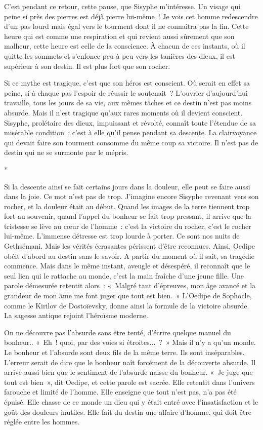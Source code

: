 \documentclass{book}
\begin{document}
C'est pendant ce retour, cette pause, que Sisyphe m'intéresse. Un visage qui peine si près des pierres est déjà pierre lui-même ! Je vois cet homme redescendre d'un pas lourd mais égal vers le tourment dont il ne connaîtra pas la fin. Cette heure qui est comme une respiration et qui revient aussi sûrement que son malheur, cette heure est celle de la conscience. À chacun de ces instants, où il quitte les sommets et s'enfonce peu à peu vers les tanières des dieux, il est supérieur à son destin. Il est plus fort que son rocher.

Si ce mythe est tragique, c'est que son héros est conscient. Où serait en effet sa peine, si à chaque pas l'espoir de réussir le soutenait ? L'ouvrier d'aujourd'hui travaille, tous les jours de sa vie, aux mêmes tâches et ce destin n'est pas moins absurde. Mais il n'est tragique qu'aux rares moments où il devient conscient. Sisyphe, prolétaire des dieux, impuissant et révolté, connaît toute l'étendue de sa misérable condition : c'est à elle qu'il pense pendant sa descente. La clairvoyance qui devait faire son tourment consomme du même coup sa victoire. Il n'est pas de destin qui ne se surmonte par le mépris.

\begin{center}
*
\end{center}

Si la descente ainsi se fait certains jours dans la douleur, elle peut se faire aussi dans la joie. Ce mot n'est pas de trop. J'imagine encore Sisyphe revenant vers son rocher, et la douleur était au début. Quand les images de la terre tiennent trop fort au souvenir, quand l'appel du bonheur se fait trop pressant, il arrive que la tristesse se lève au cœur de l'homme : c'est la victoire du rocher, c'est le rocher lui‑même. L'immense détresse est trop lourde à porter. Ce sont nos nuits de Gethsémani. Mais les vérités écrasantes périssent d'être reconnues. Ainsi, Oedipe obéit d'abord au destin sans le savoir. A partir du moment où il sait, sa tragédie commence. Mais dans le même instant, aveugle et désespéré, il reconnaît que le seul lien qui le rattache au monde, c'est la main fraîche d'une jeune fille. Une parole démesurée retentit alors : « Malgré tant d'épreuves, mon âge avancé et la grandeur de mon âme me font juger que tout est bien. » L'Oedipe de Sophocle, comme le Kirilov de Dostoïevsky, donne ainsi la formule de la victoire absurde. La sagesse antique rejoint l'héroïsme moderne.

On ne découvre pas l'absurde sans être tenté, d'écrire quelque manuel du bonheur.. « Eh ! quoi, par des voies si étroites... ? » Mais il n'y a qu'un monde. Le bonheur et l'absurde sont deux fils de la même terre. Ils sont inséparables. L'erreur serait de dire que le bonheur naît forcément de la découverte absurde. Il arrive aussi bien que le sentiment de l'absurde naisse du bonheur. « Je juge que tout est bien », dit Oedipe, et cette parole est sacrée. Elle retentit dans l'univers farouche et limité de l'homme. Elle enseigne que tout n'est pas, n'a pas été épuisé. Elle chasse de ce monde un dieu qui y était entré avec l'insatisfaction et le goût des douleurs inutiles. Elle fait du destin une affaire d'homme, qui doit être réglée entre les hommes.
\end{document}

